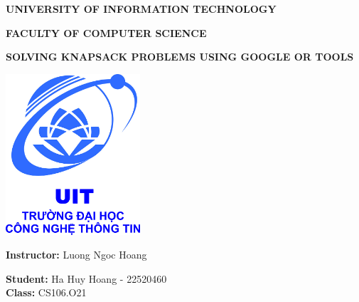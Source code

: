 \documentclass[english, a4paper,12pt]{article}
\date{}
\begin{document}
\begin{titlepage}
\begin{center}
\textbf{UNIVERSITY OF INFORMATION TECHNOLOGY}

\textbf{FACULTY OF COMPUTER SCIENCE}

\vspace{1cm}

\vspace{1cm}

\textbf{SOLVING KNAPSACK PROBLEMS USING GOOGLE OR TOOLS}

\vspace{2cm}
\includegraphics[width= 5cm]{logo.png}
\vspace{2cm}

\textbf{Instructor: } Luong Ngoc Hoang

\vspace{0.5cm}

\textbf{Student:} Ha Huy Hoang - 22520460
\vspace{0.5cm}
\\
\textbf{Class:} CS106.O21
\vspace{2cm}
\tableofcontents
\end{center}
\end{titlepage}
\end{document}
